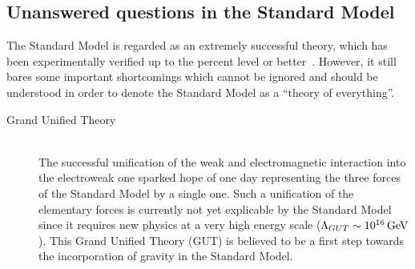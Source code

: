 \subsection{Unanswered questions in the Standard Model} \label{sec::QuestionsSM}
The Standard Model is regarded as an extremely successful theory, which has been experimentally verified up to the percent level or better~\cite{PDGReview}. However, it still bares some important shortcomings which cannot be ignored and should be understood in order to denote the Standard Model as a ``theory of everything''. 

\begin{myindentpar}
  \begin{description}
    \item[Grand Unified Theory] \hfill \\
    The successful unification of the weak and electromagnetic interaction into the electroweak one sparked hope of one day representing the three forces of the Standard Model by a single one.
    Such a unification of the elementary forces is currently not yet explicable by the Standard Model since it requires new physics at a very high energy scale ($\Lambda_{GUT} \sim 10^{16} \, \mathrm{GeV}$).
    This Grand Unified Theory (GUT) is believed to be a first step towards the incorporation of gravity in the Standard Model.
    

\end{description}
\end{myindentpar}
